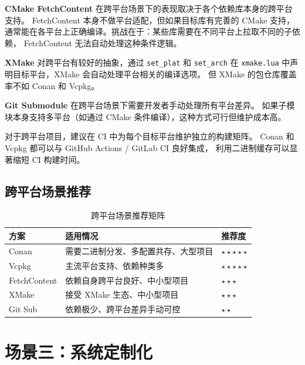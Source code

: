 \documentclass[12pt,a4paper,fontset=fandol]{ctexbook}
\begin{document}
\textbf{CMake FetchContent} 在跨平台场景下的表现取决于各个依赖库本身的跨平台支持。
FetchContent 本身不做平台适配，但如果目标库有完善的 CMake 支持，
通常能在各平台上正确编译。挑战在于：某些库需要在不同平台上拉取不同的子依赖，
FetchContent 无法自动处理这种条件逻辑。

\textbf{XMake} 对跨平台有较好的抽象，通过 \texttt{set\_plat} 和 \texttt{set\_arch}
在 \texttt{xmake.lua} 中声明目标平台，XMake 会自动处理平台相关的编译选项。
但 XMake 的包仓库覆盖率不如 Conan 和 Vcpkg。

\textbf{Git Submodule} 在跨平台场景下需要开发者手动处理所有平台差异。
如果子模块本身支持多平台（如通过 CMake 条件编译），这种方式可行但维护成本高。

\begin{note}[ title={跨平台 CI/CD 建议}]
对于跨平台项目，建议在 CI 中为每个目标平台维护独立的构建矩阵。
Conan 和 Vcpkg 都可以与 GitHub Actions / GitLab CI 良好集成，
利用二进制缓存可以显著缩短 CI 构建时间。
\end{note}

\subsection{跨平台场景推荐}

\begin{table}[H]
\centering
\caption{跨平台场景推荐矩阵}
\label{tab:scenario2}
\small
\begin{tabularx}{\textwidth}{l X l}
\toprule
\textbf{方案} & \textbf{适用情况} & \textbf{推荐度} \\
\midrule
Conan      & 需要二进制分发、多配置共存、大型项目 & $\star\star\star\star\star$ \\
Vcpkg      & 主流平台支持、依赖种类多          & $\star\star\star\star\star$ \\
FetchContent & 依赖自身跨平台良好、中小型项目    & $\star\star\star$ \\
XMake      & 接受 XMake 生态、中小型项目       & $\star\star\star$ \\
Git Sub    & 依赖极少、跨平台差异手动可控       & $\star\star$ \\
\bottomrule
\end{tabularx}
\end{table}

\section{场景三：系统定制化}
\end{document}
